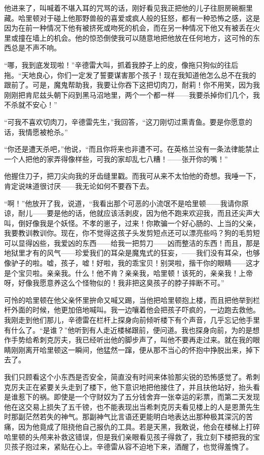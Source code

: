 \par 他进来了，叫喊着不堪入耳的咒骂的话，刚好看见我正把他的儿子往厨房碗橱里藏。哈里顿对于碰上他那野兽般的喜爱或疯人般的狂怒，都有一种恐怖之感，这是因为在前一种情况下他有被挤死或吻死的机会，而在另一种情况下他又有被丢在火里或撞在墙上的机会。他的惊恐倒使我可以随意地把他放在任何地方，这可怜的东西总是不声不响。
\par “哪，我到底发现啦！”辛德雷大叫，抓着我脖子上的皮，像拖只狗似的往后拖。“天地良心，你们一定发了誓要谋害那个孩子！现在我知道他怎么总不在我的跟前了。可是，魔鬼帮助我，我要让你吞下这把切肉刀，耐莉！你不用笑，因为我刚刚把肯尼兹头朝下闷到黑马沼地里，两个一个都一样——我要杀掉你们几个，我不杀就不安心！”
\par “可我不喜欢切肉刀，辛德雷先生，”我回答，“这刀刚切过熏青鱼。要是你愿意的话，我情愿被枪杀。”
\par “你还是遭天杀吧，”他说，“而且你将来也非遭不可。在英格兰没有一条法律能禁止一个人把他的家弄得像样些，可我的家却乱七八糟！——张开你的嘴！”
\par 他握住刀子，把刀尖向我的牙齿缝里戳。而我可从来不太怕他的奇想。我唾一下，肯定说味道很讨厌——我无论如何不要吞下去。
\par “啊！”他放开了我，说道，“我看出那个可恶的小流氓不是哈里顿——我请你原谅，耐儿——要是他的话，他就应该活剥皮，因为他不跑来欢迎我，而且还尖声大叫，倒好像我是个妖怪。不孝的崽子，过来！你欺骗一个好心肠的、上当的父亲，我要教训教训你。现在，你不觉得这孩子头发剪短点还可以漂亮些吗？狗的毛剪短可以显得凶些，我爱凶的东西——给我一把剪刀——凶而整洁的东西！而且，那是地狱里才有的风气——珍爱我们的耳朵是魔鬼式的狂妄，——我们没有耳朵，也够像驴子的啦。嘘，孩子，嘘！好啦，我的乖宝贝！别哭啦，揩干你的眼睛——这才是个宝贝啦。亲亲我。什么！他不肯？亲亲我，哈里顿！该死的，亲亲我！上帝呀，好像我愿意养这么个怪物似的！我非把这臭孩子的脖子摔断不可。”
\par 可怜的哈里顿在他父亲怀里拚命又喊又踢，当他把哈里顿抱上楼，而且把他举到栏杆外面的时候，他更加倍地喊叫。我一边嚷着他会把孩子吓疯的，一边跑去救他。我刚走到他们那儿，辛德雷在栏杆上探身向前倾听楼下有个声音，几乎忘记他手里有什么了。“是谁？”他听到有人走近楼梯跟前，便问道。我也探身向前，为的是想作手势给希刺克厉夫，我已经听出他的脚步声了，叫他不要再走过来。就在我的眼睛刚刚离开哈里顿这一瞬间，他猛然一蹿，便从那不当心的怀抱中挣脱出来，掉下去了。
\par 我们只顾看这个小东西是否安全，简直没有时间来体验那尖锐的恐怖感觉了。希刺克厉夫正在紧要关头走到了楼下，他下意识地把他接住了，并且扶他站好，抬头看是谁惹下的祸。即使是一个守财奴为了五分钱舍弃一张幸运的彩票，而第二天发现他在这交易上损失了五千镑，也不能表现出当希刺克厉夫看见楼上的人是恩萧先生时那副茫然若失的神气。那副神气比言语还更能明白地表达出那种极其深沉的苦痛，因为他竟成了阻挠他自己报仇的工具。若是天黑，我敢说，他会在楼梯上打碎哈里顿的头颅来补救这错误，但是我们亲眼看见孩子得救了，我立刻下楼把我的宝贝孩子抱过来，紧贴在心上。辛德雷从容不迫地下来，酒醒了，也觉得羞愧了。
